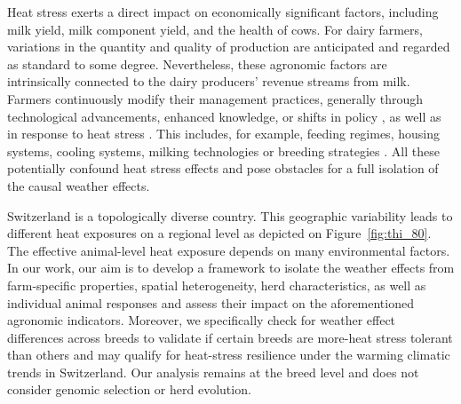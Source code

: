 \vspace*{\baselineskip}
Heat stress exerts a direct impact on economically significant factors, including milk yield, milk component yield, and the health of cows. For dairy farmers, variations in the quantity and quality of production are anticipated and regarded as standard to some degree. Nevertheless, these agronomic factors are intrinsically connected to the dairy producers' revenue streams from milk. Farmers continuously modify their management practices, generally through technological advancements, enhanced knowledge, or shifts in policy \citep{agrarbericht_2023, koutouzidou_evolution_2022}, as well as in response to heat stress \citep{ji_review_2020,vroege_effects_2023}. This includes, for example, feeding regimes, housing systems, cooling systems, milking technologies or breeding strategies \citep{kadzere_heat_2002, west_effects_2003}. All these potentially confound heat stress effects and pose obstacles for a full isolation of the causal weather effects.

\vspace*{\baselineskip}
Switzerland is a topologically diverse country. This geographic variability leads to different heat exposures on a regional level as depicted on Figure~\ref{fig:thi_80}. The effective animal-level heat exposure depends on many environmental factors. In our work, our aim is to develop a framework to isolate the weather effects from farm-specific properties, spatial heterogeneity, herd characteristics, as well as individual animal responses and assess their impact on the aforementioned agronomic indicators. Moreover, we specifically check for weather effect differences across breeds to validate if certain breeds are more-heat stress tolerant than others and may qualify for heat-stress resilience under the warming climatic trends in Switzerland. Our analysis remains at the breed level and does not consider genomic selection or herd evolution.

